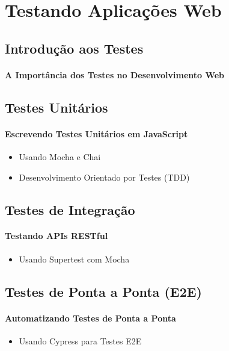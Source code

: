 
\chapter{Testando Aplicações Web}
\section{Introdução aos Testes}
\subsubsection{A Importância dos Testes no Desenvolvimento Web}

\section{Testes Unitários}
\subsubsection{Escrevendo Testes Unitários em JavaScript}
\begin{itemize}
\item Usando Mocha e Chai
\item Desenvolvimento Orientado por Testes (TDD)
\end{itemize}


\section{Testes de Integração}

\subsubsection{Testando APIs RESTful}
\begin{itemize}
\item Usando Supertest com Mocha
\end{itemize}


\section{Testes de Ponta a Ponta (E2E)}

\subsubsection{Automatizando Testes de Ponta a Ponta}
\begin{itemize}
\item Usando Cypress para Testes E2E
\end{itemize}













